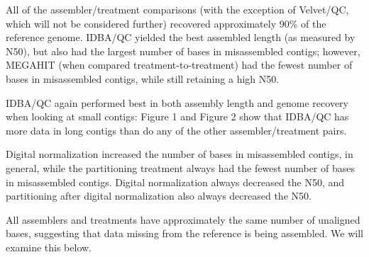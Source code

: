 All of the assembler/treatment comparisons (with the exception of
Velvet/QC, which will not be considered further) recovered
approximately 90\% of the reference genome.  IDBA/QC yielded the best
assembled length (as measured by N50), but also had the largest number
of bases in misassembled contigs; however, MEGAHIT (when compared
treatment-to-treatment) had the fewest number of bases in misassembled
contigs, while still retaining a high N50.

IDBA/QC again performed best in both assembly length and genome
recovery when looking at small contigs: Figure 1 and Figure 2 show
that IDBA/QC has more data in long contigs than do any of the other
assembler/treatment pairs.

Digital normalization increased the number of bases in misassembled
contigs, in general, while the partitioning treatment always had the
fewest number of bases in misassembled contigs.  Digital normalization
always decreased the N50, and partitioning after digital normalization
also always decreased the N50.

All assemblers and treatments have approximately the same number of
unaligned bases, suggesting that data missing from the reference is
being assembled.  We will examine this below.





